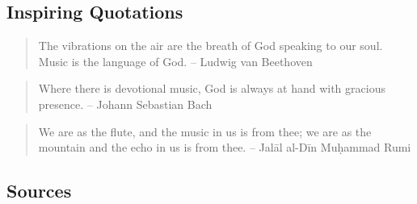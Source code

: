 \documentclass[12pt]{article}
\begin{document}
\subsection*{Inspiring Quotations}

\begin{quote}
  The vibrations on the air are the breath of God speaking to our soul. Music is the language of God. – Ludwig van Beethoven
\end{quote}

\begin{quote}
  Where there is devotional music, God is always at hand with gracious presence. – Johann Sebastian Bach
\end{quote}

\begin{quote}
  We are as the flute, and the music in us is from thee; we are as the mountain and the echo in us is from thee. – Jalāl al-Dīn Muḥammad Rumi
\end{quote}




\subsection*{Sources}

\end{document}
